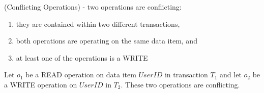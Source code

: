 

%  
%  

\begin{definition}
\label{conflict_ops}
 (Conflicting Operations) - two operations are conflicting:

 \begin{enumerate}
   \item they are contained within two different transactions,
   \item both operations are operating on the same data item, and
   \item at least one of the operations is a WRITE
 \end{enumerate}

 \begin{example}
 \label{ex_conflict_ops}
  Let $o_{1}$ be a READ operation on data item $User ID$ in transaction $T_{1}$ and let $o_{2}$ be a WRITE operation on $User ID$ in $T_{2}$. These two operations are conflicting.
 \end{example}
\end{definition}

